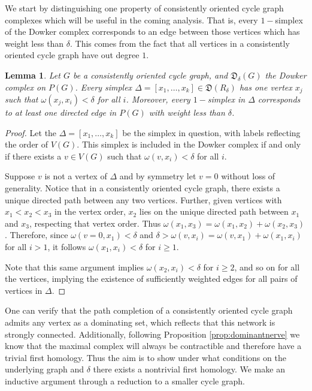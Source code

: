 \documentclass[pdflatex,bst/sn-mathphys-num]{sn-jnl}%
\theoremstyle{thmstyleone}%
\newtheorem{lem}[theorem]{Lemma}%
\theoremstyle{definition}
\theoremstyle{thmstyletwo}%
\newcommand{\FD}{\mathfrak{D}}
\theoremstyle{thmstylethree}%
\begin{document}
We start by distinguishing one property of consistently oriented cycle graph complexes which will be useful in the coming analysis. That is, every $1-$simplex of the Dowker complex corresponds to an edge between those vertices which has weight less than $\delta$. This comes from the fact that all vertices in a consistently oriented cycle graph have out degree $1$.

\begin{lem}\label{lem:simplex_order}
    Let $G$ be a consistently oriented cycle graph, and $\FD_\delta(G)$ the Dowker complex on $P(G)$. Every simplex $\Delta = [x_1,\dotsc,x_k]\in \FD(R_\delta)$ has one vertex $x_j$ such that $\omega(x_j,x_i)<\delta$ for all $i$. Moreover, every $1-$simplex in $\Delta$ corresponds to at least one directed edge in $P(G)$ with weight less than $\delta$.
\end{lem}

\begin{proof}
    Let the $\Delta = [x_1,\dotsc,x_k]$ be the simplex in question, with labels reflecting the order of $V(G)$. This simplex is included in the Dowker complex if and only if there exists a $v\in V(G)$ such that $\omega(v,x_i)<\delta$ for all $i$. 

    Suppose $v$ is not a vertex of $\Delta$ and by symmetry let $v=0$ without loss of generality. Notice that in a consistently oriented cycle graph, there exists a unique directed path between any two vertices. Further, given vertices with $x_1<x_2<x_3$ in the vertex order, $x_2$ lies on the unique directed path between $x_1$ and $x_3$, respecting that vertex order. Thus $\omega(x_1,x_3)=\omega(x_1,x_2) + \omega(x_2,x_3)$. Therefore, since $\omega(v=0,x_1)<\delta$ and $\delta>\omega(v,x_i)=\omega(v,x_1)+\omega(x_1,x_i)$ for all $i>1$, it follows $\omega(x_1,x_i)<\delta$ for $i\geq 1$.

    Note that this same argument implies $\omega(x_2,x_i)<\delta$ for $i\geq2$, and so on for all the vertices, implying the existence of sufficiently weighted edges for all pairs of vertices in $\Delta$.
\end{proof}

One can verify that the path completion of a consistently oriented cycle graph admits any vertex as a dominating set, which reflects that this network is strongly connected. Additionally, following Proposition \ref{prop:dominantnerve} we know that the maximal complex will always be contractible and therefore have a trivial first homology. Thus the aim is to show under what conditions on the underlying graph and $\delta$ there exists a nontrivial first homology. We make an inductive argument through a reduction to a smaller cycle graph.
\end{document}
